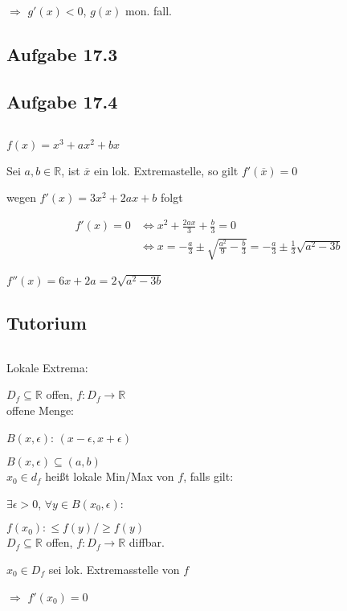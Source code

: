 $\Rightarrow$ $g'(x)<0$, $g(x)$ mon. fall.

\newpage

\subsection{Aufgabe 17.3}

\subsection{Aufgabe 17.4}
$ $\newline

$f(x)=x^3+ax^2+bx$

Sei $a,b\in\mathbb{R}$, ist $\overline{x}$ ein lok. Extremastelle, so gilt $f'(\overline{x})=0$

wegen $f'(x)=3x^2+2ax+b$ folgt

\begin{align*}
f'(x)=0&\Leftrightarrow x^2+\frac{2ax}{3}+\frac{b}{3}=0\\
&\Leftrightarrow x=-\frac{a}{3}\pm\sqrt{\frac{a^2}{9}-\frac{b}{3}}=-\frac{a}{3}\pm\frac{1}{3}\sqrt{a^2-3b}
\end{align*}

$f''(x)=6x+2a=2\sqrt{a^2-3b}$

\newpage

\subsection{Tutorium}
$ $\newline

Lokale Extrema:

$D_f\subseteq \mathbb{R}$ offen, $f:D_f\rightarrow\mathbb{R}$\\

offene Menge:

$B(x,\epsilon)$: $(x-\epsilon,x+\epsilon)$

$B(x,\epsilon)\subseteq(a,b)$\\

$x_0\in d_f$ heißt lokale Min/Max von $f$, falls gilt:

$\exists\epsilon>0$, $\forall y\in B(x_0,\epsilon)$:

$f(x_0):\leq f(y)/\geq f(y)$\\

$D_f\subseteq \mathbb{R}$ offen, $f:D_f\rightarrow\mathbb{R}$ diffbar.

$x_0\in D_f$ sei lok. Extremasstelle von $f$

$\Rightarrow$ $f'(x_0)=0$
